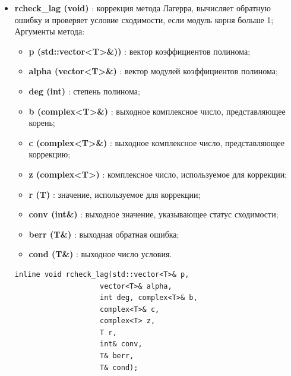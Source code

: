 \documentclass[a4paper,12pt]{article}
\begin{document}
\begin{itemize}
    \item \textbf{rcheck\_lag (void)} : коррекция метода Лагерра, вычисляет обратную ошибку и проверяет условие сходимости, если модуль корня больше 1;
    \\Аргументы метода:
    \begin{itemize}
        \renewcommand{\labelitemi}{-}
        \item \textbf{p (std::vector<T>\&))} : вектор коэффициентов полинома;
        \item \textbf{alpha (vector<T>\&)} : вектор модулей коэффициентов полинома;
        \item \textbf{deg (int)} : степень полинома;
        \item \textbf{b (complex<T>\&)} : выходное комплексное число, представляющее корень;
        \item \textbf{c (complex<T>\&)} : выходное комплексное число, представляющее коррекцию;
        \item \textbf{z (complex<T>)} : комплексное число, используемое для коррекции;
        \item \textbf{r (T)} : значение, используемое для коррекции;
        \item \textbf{conv (int\&)} : выходное значение, указывающее статус сходимости;
        \item \textbf{berr (T\&)} : выходная обратная ошибка;
        \item \textbf{cond (T\&)} : выходное число условия.
    \end{itemize}

\begin{lstlisting}[language=С++]
inline void rcheck_lag(std::vector<T>& p, 
                    vector<T>& alpha, 
                    int deg, complex<T>& b, 
                    complex<T>& c, 
                    complex<T> z, 
                    T r, 
                    int& conv, 
                    T& berr, 
                    T& cond); \end{lstlisting}
    


\end{itemize}
\end{document}
